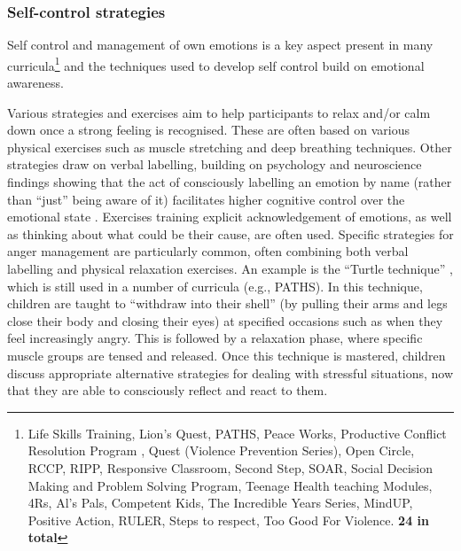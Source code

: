 \documentclass[prodmode,acmtochi]{acmsmall}
\newcommand{\todo}[1]{\textrm{\textrm{\textcolor{LightBlue}{[[#1]]}}}}
\newcommand{\todolater}[1]{}
\begin{document}
\subsubsection{Self-control strategies}
Self control and management of own emotions is a key aspect present in many curricula\footnote{Life Skills Training, Lion's Quest, PATHS, Peace Works, Productive Conflict Resolution Program , Quest (Violence Prevention Series), Open Circle, RCCP, RIPP, Responsive Classroom, Second Step, SOAR, Social Decision Making and Problem Solving Program, Teenage Health teaching Modules, 4Rs, Al's Pals, Competent Kids, The Incredible Years Series, MindUP, Positive Action, RULER, Steps to respect, Too Good For Violence. {\bf 24 in total}} and the techniques used to develop self control build on emotional awareness.%

Various strategies and exercises aim to help participants to relax and/or calm down once a strong feeling is recognised. These are often based on various physical exercises such as muscle stretching and deep breathing techniques. Other strategies draw on verbal labelling, building on psychology and neuroscience findings showing that the act of consciously labelling an emotion by name (rather than ``just'' being aware of it) facilitates higher cognitive control over the emotional state \cite{Greenberg2006,Reyes2012}. Exercises training explicit acknowledgement of emotions, as well as thinking about what could be their cause, are often used. 
Specific strategies for anger management are particularly common, often combining both verbal labelling and physical relaxation exercises. An example is the ``Turtle technique'' \cite{Robin1976}, which is still used in a number of curricula (e.g., PATHS). In this technique, children are taught to ``withdraw into their shell'' (by pulling their arms and legs close their body and closing their eyes) at specified occasions such as when they feel increasingly angry. This is followed by a relaxation phase, where specific muscle groups are tensed and released. Once this technique is mastered, children discuss appropriate alternative strategies for dealing with stressful situations, now that they are able to consciously reflect and react to them. 
\todolater{For older children, self-control exercises focus on supporting personal management more broadly, such as promoting goal setting, self-motivation and grit.}
\end{document}

